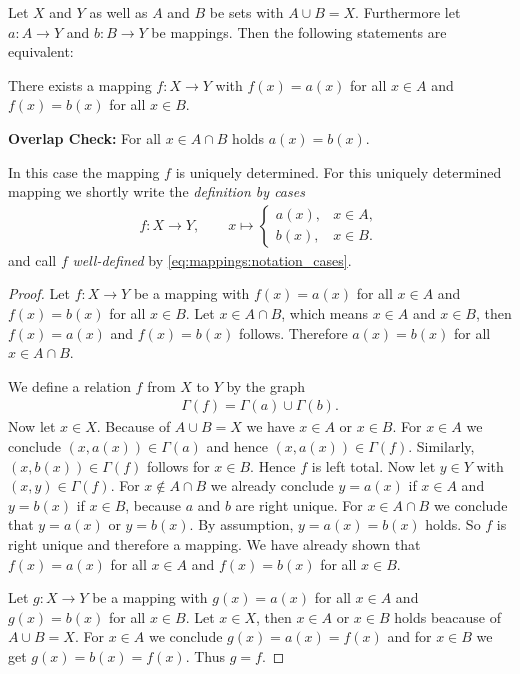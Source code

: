 \begin{theorem}\label{theorem:mappings:well_defined_cases}
    Let $X$ and $Y$ as well as $A$ and $B$ be sets with $A\cup B=X$. Furthermore let $a\colon A\rightarrow Y$ and $b\colon B\rightarrow Y$ be mappings. Then the following statements are equivalent:
    \begin{intheoremenumerate}
        \item There exists a mapping $f\colon X\rightarrow Y$ with $f(x)=a(x)$ for all $x\in A$ and $f(x)=b(x)$ for all $x\in B$.
        \item\textbf{Overlap Check:} For all $x\in A\cap B$ holds $a(x)=b(x)$.
    \end{intheoremenumerate}
    In this case the mapping $f$ is uniquely determined. For this uniquely determined mapping we shortly write the \emph{definition by cases}
    \begin{align}f\colon X\rightarrow Y,\qquad x\mapsto \begin{cases}a(x),& x\in A,\\ b(x),& x\in B.\end{cases}\label{eq:mappings:notation_cases}\end{align}
    and call $f$ \emph{well-defined} by \eqref{eq:mappings:notation_cases}.
\end{theorem}
\begin{proof}
     Let $f\colon X\to Y$ be a mapping with $f(x)=a(x)$ for all $x\in A$ and $f(x)=b(x)$ for all $x\in B$. Let $x\in A\cap B$, which means $x\in A$ and $x\in B$, then $f(x)=a(x)$ and $f(x)=b(x)$ follows. Therefore $a(x)=b(x)$ for all $x\in A\cap B$.

     We define a relation $f$ from $X$ to $Y$ by the graph \begin{align}\Gamma(f)=\Gamma(a)\cup\Gamma(b).\end{align}
    Now let $x\in X$. Because of $A\cup B=X$ we have $x\in A$ or $x\in B$. For $x\in A$ we conclude $(x,a(x))\in\Gamma(a)$ and hence $(x,a(x))\in\Gamma(f)$. Similarly, $(x,b(x))\in\Gamma(f)$ follows for $x\in B$. Hence $f$ is left total. Now let $y\in Y$ with $(x,y)\in\Gamma(f)$. For $x\notin A\cap B$ we already conclude $y=a(x)$ if $x\in A$ and $y=b(x)$ if $x\in B$, because $a$ and $b$ are right unique. For $x\in A\cap B$ we conclude that $y=a(x)$ or $y=b(x)$. By assumption, $y=a(x)=b(x)$ holds. So $f$ is right unique and therefore a mapping. We have already shown that $f(x)=a(x)$ for all $x\in A$ and $f(x)=b(x)$ for all $x\in B$.

     Let $g\colon X\rightarrow Y$ be a mapping with $g(x)=a(x)$ for all $x\in A$ and $g(x)=b(x)$ for all $x\in B$. Let $x\in X$, then $x\in A$ or $x\in B$ holds beacause of $A\cup B=X$. For $x\in A$ we conclude $g(x)=a(x)=f(x)$ and for $x\in B$ we get $g(x)=b(x)=f(x)$. Thus $g=f$.
\end{proof}

